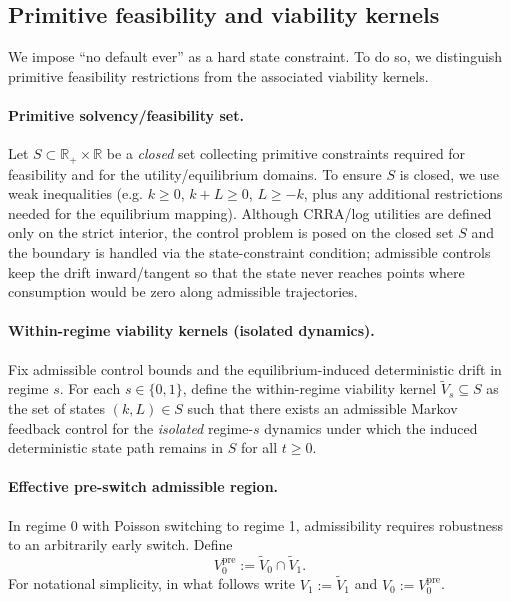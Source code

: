 \documentclass{article}
\begin{document}
\subsection{Primitive feasibility and viability kernels}

We impose ``no default ever'' as a hard state constraint. To do so, we distinguish primitive feasibility restrictions
from the associated viability kernels.

\paragraph{Primitive solvency/feasibility set.}
Let $S\subset\mathbb R_+\times\mathbb R$ be a \emph{closed} set collecting primitive constraints required for feasibility
and for the utility/equilibrium domains. To ensure $S$ is closed, we use weak inequalities (e.g. $k\ge 0$, $k+L\ge 0$,
$L\ge -k$, plus any additional restrictions needed for the equilibrium mapping). Although CRRA/log utilities are defined
only on the strict interior, the control problem is posed on the closed set $S$ and the boundary is handled via the
state-constraint condition; admissible controls keep the drift inward/tangent so that the state never reaches points
where consumption would be zero along admissible trajectories.

\paragraph{Within-regime viability kernels (isolated dynamics).}
Fix admissible control bounds and the equilibrium-induced deterministic drift in regime $s$. For each $s\in\{0,1\}$, define
the within-regime viability kernel $\widetilde V_s\subseteq S$ as the set of states $(k,L)\in S$ such that there exists an
admissible Markov feedback control for the \emph{isolated} regime-$s$ dynamics under which the induced deterministic state
path remains in $S$ for all $t\ge 0$.

\paragraph{Effective pre-switch admissible region.}
In regime 0 with Poisson switching to regime 1, admissibility requires robustness to an arbitrarily early switch. Define
\[
V_0^{\mathrm{pre}}:=\widetilde V_0\cap \widetilde V_1.
\tag{51}
\]
For notational simplicity, in what follows write $V_1:=\widetilde V_1$ and $V_0:=V_0^{\mathrm{pre}}$.
\end{document}
